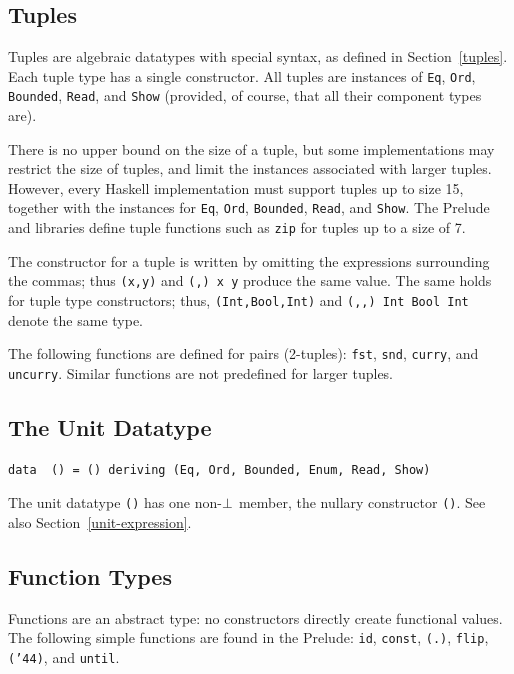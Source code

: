\subsection{Tuples}
\label{basic-tuples}

Tuples are algebraic datatypes with special syntax, as defined
in Section~\ref{tuples}.  Each tuple type has a single constructor.
All tuples are instances of \mbox{\tt Eq}, \mbox{\tt Ord}, \mbox{\tt Bounded}, \mbox{\tt Read},
and \mbox{\tt Show} (provided, of course, that all their component types are).

There is no upper bound on the size of a tuple, but some \Haskell{}
implementations may restrict the size of tuples, and limit the
instances associated with larger tuples.  However, every Haskell
implementation must support tuples up to size 15, together with the instances
for \mbox{\tt Eq}, \mbox{\tt Ord}, \mbox{\tt Bounded}, \mbox{\tt Read}, and \mbox{\tt Show}.  The Prelude and
libraries define tuple functions such as \mbox{\tt zip} for tuples up to a size
of 7.

The constructor for a tuple is written by omitting the expressions
surrounding the commas; thus \mbox{\tt (x,y)} and \mbox{\tt (,)\ x\ y} produce the same
value. The same holds for tuple type constructors; thus, \mbox{\tt (Int,Bool,Int)}
and \mbox{\tt (,,)\ Int\ Bool\ Int} denote the same type.
\indextt{(,)}
\indextt{(,,)}

The following functions are defined for pairs (2-tuples):
\mbox{\tt fst}, \mbox{\tt snd}, \mbox{\tt curry}, and \mbox{\tt uncurry}.  Similar functions are not
predefined for larger tuples.

\subsection{The Unit Datatype}
\label{basic-trivial}
\bprog
{\small\begin{verbatim}
data  () = () deriving (Eq, Ord, Bounded, Enum, Read, Show)
\end{verbatim}}
\eprog
The unit datatype \mbox{\tt ()} has one non-\mbox{$\it \bot$}
member, the nullary constructor \mbox{\tt ()}.  See also Section~\ref{unit-expression}.

\subsection{Function Types}
Functions are an abstract type: no constructors directly create
functional values.  The following simple functions are found in the Prelude:
\mbox{\tt id}, \mbox{\tt const}, \mbox{\tt (.)}, \mbox{\tt flip}, \mbox{\tt ({\char'44})}, and \mbox{\tt until}.

